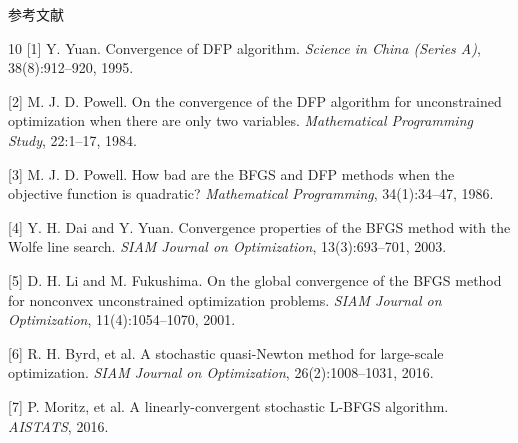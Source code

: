 \documentclass[11pt,hyperref={pdfpagelabels=false}]{beamer}
\begin{document}
\begin{frame}[allowframebreaks]{参考文献}
    \footnotesize
    \begin{thebibliography}{10}
        [1] Y. Yuan. Convergence of DFP algorithm. \emph{Science in China (Series A)}, 38(8):912–920, 1995.
        
        [2] M. J. D. Powell. On the convergence of the DFP algorithm for unconstrained optimization when there are only two variables. \emph{Mathematical Programming Study}, 22:1–17, 1984.
        
        [3] M. J. D. Powell. How bad are the BFGS and DFP methods when the objective function is quadratic? \emph{Mathematical Programming}, 34(1):34–47, 1986.
        
        [4] Y. H. Dai and Y. Yuan. Convergence properties of the BFGS method with the Wolfe line search. \emph{SIAM Journal on Optimization}, 13(3):693–701, 2003.
        
        [5] D. H. Li and M. Fukushima. On the global convergence of the BFGS method for nonconvex unconstrained optimization problems. \emph{SIAM Journal on Optimization}, 11(4):1054–1070, 2001.
        
        [6] R. H. Byrd, et al. A stochastic quasi-Newton method for large-scale optimization. \emph{SIAM Journal on Optimization}, 26(2):1008–1031, 2016.
        
        [7] P. Moritz, et al. A linearly-convergent stochastic L-BFGS algorithm. \emph{AISTATS}, 2016.
    \end{thebibliography}
\end{frame}
\end{document}
